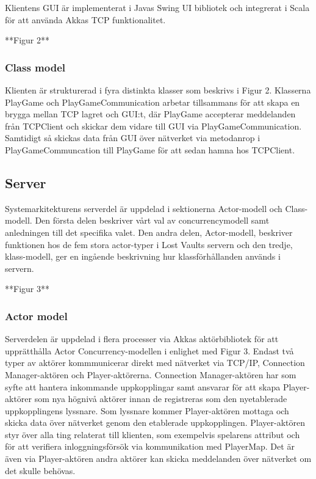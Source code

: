 \documentclass[a4paper]{article}
\begin{document}
Klientens GUI är implementerat i Javas Swing UI bibliotek och integrerat i Scala för att använda Akkas TCP funktionalitet.

**Figur 2**
    
\subsubsection{Class model}
Klienten är strukturerad i fyra distinkta klasser som beskrivs i Figur 2. Klasserna PlayGame och PlayGameCommunication arbetar 
tillsammans för att skapa en brygga mellan TCP lagret och GUI:t, där PlayGame accepterar meddelanden från TCPClient och skickar dem 
vidare till GUI via PlayGameCommunication. Samtidigt så skickas data från GUI över nätverket via metodanrop i PlayGameCommuncation till 
PlayGame för att sedan hamna hos TCPClient.

\subsection{Server}
Systemarkitekturens serverdel är uppdelad i sektionerna  Actor-modell och Class-modell. Den första delen beskriver vårt 
val av concurrencymodell samt anledningen till det specifika valet. Den andra delen, Actor-modell, beskriver funktionen hos de fem stora actor-typer i Lost Vaults servern och 
den tredje, klass-modell, ger en ingående beskrivning hur klassförhållanden används i servern.


**Figur 3**

\subsubsection{Actor model}
Serverdelen är uppdelad i flera processer via Akkas aktörbibliotek för att upprätthålla Actor Concurrency-modellen i enlighet med Figur 3. Endast två typer av aktörer kommmunicerar 
direkt med nätverket via TCP/IP, Connection Manager-aktören och Player-aktörerna. Connection Manager-aktören har som syfte att hantera inkommande uppkopplingar samt ansvarar 
för att skapa Player-aktörer som nya högnivå aktörer innan de registreras som den nyetablerade uppkopplingens lyssnare. Som lyssnare kommer Player-aktören mottaga och skicka data 
över nätverket genom den etablerade uppkopplingen. Player-aktören styr över alla ting relaterat till klienten, som exempelvis spelarens attribut och för att verifiera 
inloggningsförsök via kommunikation med PlayerMap. Det är även via Player-aktören andra aktörer kan skicka meddelanden över nätverket om det skulle behövas. 
\end{document}
